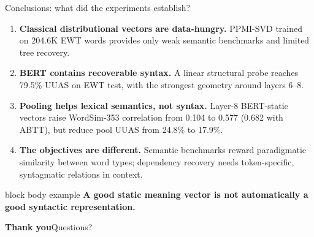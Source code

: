 \documentclass[aspectratio=169,9pt]{beamer}
\newcommand{\tightitem}{\setlength{\itemsep}{0.14em}\setlength{\parskip}{0pt}}
\begin{document}
\begin{frame}{Conclusions: what did the experiments establish?}
\begin{enumerate}\tightitem
  \item \textbf{Classical distributional vectors are data-hungry.} PPMI-SVD trained on 204.6K EWT words provides only weak semantic benchmarks and limited tree recovery.
  \item \textbf{BERT contains recoverable syntax.} A linear structural probe reaches 79.5\% UUAS on EWT test, with the strongest geometry around layers 6--8.
  \item \textbf{Pooling helps lexical semantics, not syntax.} Layer-8 BERT-static vectors raise WordSim-353 correlation from 0.104 to 0.577 (0.682 with ABTT), but reduce pool UUAS from 24.8\% to 17.9\%.
  \item \textbf{The objectives are different.} Semantic benchmarks reward paradigmatic similarity between word types; dependency recovery needs token-specific, syntagmatic relations in context.
\end{enumerate}
\vspace{0.35em}
\begin{beamercolorbox}[rounded=true,sep=1.0ex,wd=\linewidth]{block body example}
  \centering\Large\bfseries\color{Navy}
  A good static meaning vector is not automatically a good syntactic representation.
\end{beamercolorbox}
\vspace{0.3em}
\centering\Large\color{Teal}\textbf{Thank you}\quad\textcolor{Muted}{\normalsize Questions?}
\end{frame}
\end{document}
